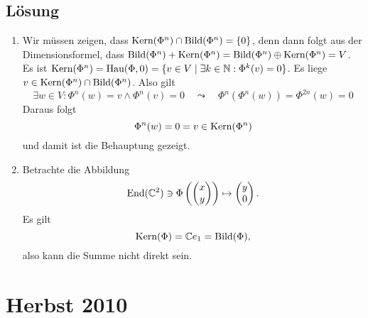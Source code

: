 \subsection{Lösung}
\begin{enumerate}
	\item Wir müssen zeigen, dass \( \text{Kern}(\Phi^n) \cap \text{Bild}(\Phi^n) = \{ 0 \} \), denn dann folgt aus der Dimensionsformel, dass \( \text{Bild}(\Phi^n) + \text{Kern}(\Phi^n) = \text{Bild}(\Phi^n) \oplus \text{Kern}(\Phi^n) = V \). \\
		Es ist \( \text{Kern}(\Phi^n) = \text{Hau}(\Phi, 0) = \{ v \in V \mid \exists k \in \mathbb{N}: \Phi^k(v) = 0 \} \). Es liege \( v \in \text{Kern}(\Phi^n) \cap \text{Bild}(\Phi^n) \). Also gilt
		\begin{equation*}
			\exists w \in V: \Phi^n(w) = v \wedge \Phi^n(v) = 0 \quad \leadsto \quad \Phi^n(\Phi^n(w)) = \Phi^{2n}(w) = 0
		\end{equation*}
		Daraus folgt
		\begin{equation*}
			\Phi^n(w) = 0 = v \in \text{Kern}(\Phi^n)
		\end{equation*}
		und damit ist die Behauptung gezeigt. 

	\item Betrachte die Abbildung
		\begin{equation*}
			\text{End}(\mathbb{C}^2) \ni \Phi\left( \begin{pmatrix}
				x \\ y
			\end{pmatrix} \right) \mapsto \begin{pmatrix}
				y \\ 0
			\end{pmatrix}\text{.}
		\end{equation*}
		Es gilt
		\begin{equation*}
			\text{Kern}(\Phi) = \mathbb{C} e_1 = \text{Bild}(\Phi)\text{,}
		\end{equation*}
		also kann die Summe nicht direkt sein.
\end{enumerate}

\newpage

\section{Herbst 2010}

